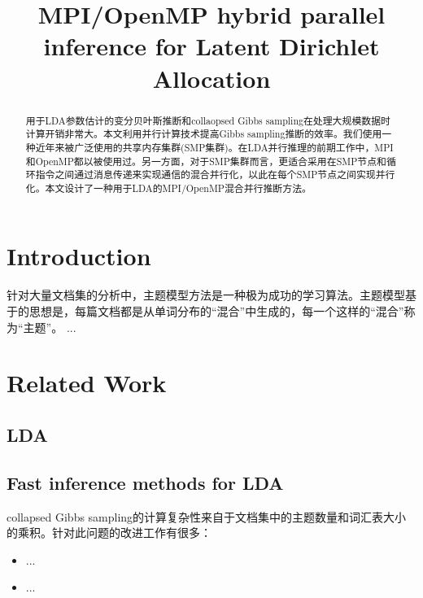 \documentclass{article}
\begin{document}
\title{MPI/OpenMP hybrid parallel inference for Latent Dirichlet Allocation}
\date{}
\maketitle

\begin{abstract}
用于LDA参数估计的变分贝叶斯推断和collaopsed Gibbs sampling在处理大规模数据时计算开销非常大。本文利用并行计算技术提高Gibbs sampling推断的效率。我们使用一种近年来被广泛使用的共享内存集群(SMP集群)。在LDA并行推理的前期工作中，MPI和OpenMP都以被使用过。另一方面，对于SMP集群而言，更适合采用在SMP节点和循环指令之间通过消息传递来实现通信的混合并行化，以此在每个SMP节点之间实现并行化。本文设计了一种用于LDA的MPI/OpenMP混合并行推断方法。
\end{abstract}

\section{Introduction}
针对大量文档集的分析中，主题模型方法是一种极为成功的学习算法。主题模型基于的思想是，每篇文档都是从单词分布的“混合”中生成的，每一个这样的“混合”称为“主题”。
...

\section{Related Work}
\subsection{LDA}

\subsection{Fast inference methods for LDA}
collapsed Gibbs sampling的计算复杂性来自于文档集中的主题数量和词汇表大小的乘积。针对此问题的改进工作有很多：
\begin{itemize}
	\item ...
	\item ...
\end{itemize}
\end{document}

